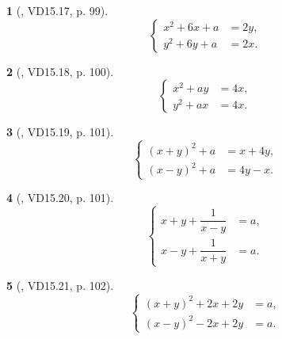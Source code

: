 \documentclass{article}
\newtheorem{baitoan}{}
\begin{document}
\begin{baitoan}[\cite{TLCT_THCS_Toan_9_dai_so}, VD15.17, p. 99]
	\begin{equation*}
		\left\{\begin{split}
			x^2 + 6x + a &= 2y,\\
			y^2 + 6y + a &= 2x.
		\end{split}\right.
	\end{equation*}
\end{baitoan}

\begin{baitoan}[\cite{TLCT_THCS_Toan_9_dai_so}, VD15.18, p. 100]
	\begin{equation*}
		\left\{\begin{split}
			x^2 + ay &= 4x,\\
			y^2 + ax &= 4x.
		\end{split}\right.
	\end{equation*}
\end{baitoan}

\begin{baitoan}[\cite{TLCT_THCS_Toan_9_dai_so}, VD15.19, p. 101]
	\begin{equation*}
		\left\{\begin{split}
			(x + y)^2 + a &= x + 4y,\\
			(x - y)^2 + a &= 4y - x.
		\end{split}\right.
	\end{equation*}
\end{baitoan}

\begin{baitoan}[\cite{TLCT_THCS_Toan_9_dai_so}, VD15.20, p. 101]
	\begin{equation*}
		\left\{\begin{split}
			x + y + \dfrac{1}{x - y} &= a,\\
			x - y + \dfrac{1}{x + y} &= a.
		\end{split}\right.
	\end{equation*}
\end{baitoan}

\begin{baitoan}[\cite{TLCT_THCS_Toan_9_dai_so}, VD15.21, p. 102]
	\begin{equation*}
		\left\{\begin{split}
			(x + y)^2 + 2x + 2y &= a,\\
			(x - y)^2 - 2x + 2y &= a.
		\end{split}\right.
	\end{equation*}
\end{baitoan}
\end{document}

